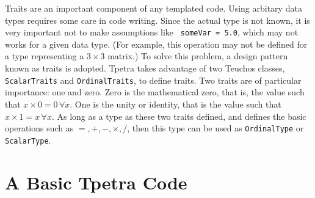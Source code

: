 Traits are an important component of any templated code.
Using arbitary data types requires some care in code writing. Since the actual
type is not known, it is very important not to make assumptions like {\tt
  someVar = 5.0}, which may not works for a given data type. 
  (For example, this operation may not be defined for a type representing a $3
   \times 3$ matrix.) To solve this problem, a design pattern known as traits
  is adopted. Tpetra takes advantage of two Teuchos classes, {\tt
    ScalarTraits} and {\tt OrdinalTraits}, to define traits. Two traits are of
    particular importance: one and zero. Zero is the mathematical zero, that
    is, the value such that $x \times 0 = 0 \, \forall x$. One is the unity or
    identity, that is the value such that $x \times 1 = x \, \forall x$. As
    long as a type as these two traits defined, and defines the basic
    operations such as $=, +, -, \times, /$, then this type can be used as
    {\tt OrdinalType} or {\tt ScalarType}.

\section{A Basic Tpetra Code}
\label{sec:tpetra_basic}

